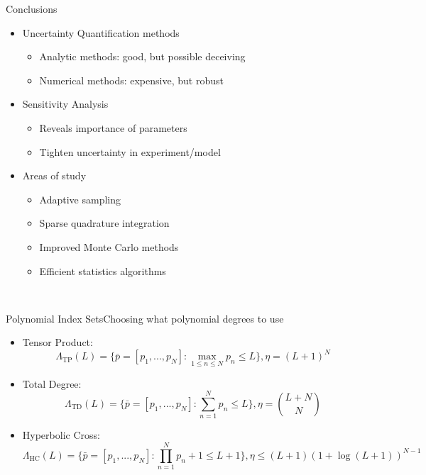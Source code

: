 \documentclass{beamer}
\begin{document}
\begin{frame}[label=conc]{Conclusions}\vspace{-20pt}
\begin{itemize}
\item Uncertainty Quantification methods
    \begin{itemize}
    \item Analytic methods: good, but possible deceiving
    \item Numerical methods: expensive, but robust
    \end{itemize}\vspace{10pt}
\item Sensitivity Analysis
    \begin{itemize}
    \item Reveals importance of parameters
    \item Tighten uncertainty in experiment/model
    \end{itemize}\vspace{10pt}
\item Areas of study
   \begin{itemize}
   \item Adaptive sampling
   \item Sparse quadrature integration
   \item Improved Monte Carlo methods
   \item Efficient statistics algorithms
   \end{itemize}
\end{itemize}
\end{frame}

\begin{frame}
$\ $
\end{frame}

\begin{frame}{Polynomial Index Sets}{Choosing what polynomial degrees to use}\vspace{-20pt}
\begin{itemize}
\item Tensor Product:\scriptsize\[\Lambda_\text{TP}(L)=\Big\{\bar p=[p_1,...,p_N]: \max_{1\leq n\leq N}p_n\leq L \Big\},\eta=(L+1)^N\]\normalsize
\item Total Degree: \scriptsize\[\Lambda_\text{TD}(L)=\Big\{\bar p=[p_1,...,p_N]:\sum_{n=1}^N p_n \leq L \Big\},\eta={L+N\choose N}\]\normalsize
\item Hyperbolic Cross: \scriptsize\[\Lambda_\text{HC}(L)=\Big\{\bar p=[p_1,...,p_N]:\prod_{n=1}^N p_n+1 \leq L+1 \Big\},\eta\leq (L+1)(1+\log(L+1))^{N-1}\]
\end{itemize}
\end{frame}
\end{document}
